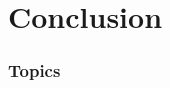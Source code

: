 \documentclass{beamer}
\begin{document}
\section{Conclusion}
\begin{frame}


\frametitle{Topics}

\end{frame}

\begin{frame}
    {\footnotesize
    
    
    }
\end{frame}
\end{document}

